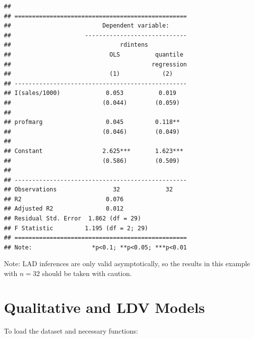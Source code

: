\documentclass[]{book}
\begin{document}
\begin{verbatim}
## 
## =================================================
##                          Dependent variable:     
##                     -----------------------------
##                               rdintens           
##                            OLS          quantile 
##                                        regression
##                            (1)            (2)    
## -------------------------------------------------
## I(sales/1000)             0.053          0.019   
##                          (0.044)        (0.059)  
##                                                  
## profmarg                  0.045         0.118**  
##                          (0.046)        (0.049)  
##                                                  
## Constant                 2.625***       1.623*** 
##                          (0.586)        (0.509)  
##                                                  
## -------------------------------------------------
## Observations                32             32    
## R2                        0.076                  
## Adjusted R2               0.012                  
## Residual Std. Error  1.862 (df = 29)             
## F Statistic         1.195 (df = 2; 29)           
## =================================================
## Note:                 *p<0.1; **p<0.05; ***p<0.01
\end{verbatim}

Note: LAD inferences are only valid asymptotically, so the results in this example with \(n =32\) should be taken with caution.

\hypertarget{binarymodels}{%
\chapter{Qualitative and LDV Models}\label{binarymodels}}

To load the dataset and necessary functions:
\end{document}
